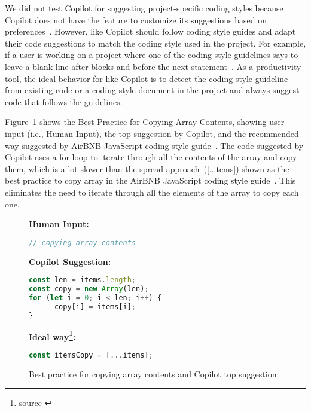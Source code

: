 We did not test Copilot for suggesting project-specific coding styles because Copilot does not have the feature to customize its suggestions based on preferences~\cite{Copilot-web}.
However, \cct{} like Copilot should follow coding style guides and adapt their code suggestions to match the coding style used in the project. 
For example, if a user is working on a project where one of the coding style guidelines says to leave a blank line after blocks and before the next statement~\cite{airbnb_code}. As a productivity tool, the ideal behavior for \cct{} like Copilot is to detect the coding style guideline from existing code or a coding style document in the project and always suggest code that follows the guidelines.

Figure~\ref{fig:bp_1} shows the Best Practice for Copying Array Contents, showing user input (i.e., Human Input), the top suggestion by Copilot, and the recommended way suggested by AirBNB JavaScript coding style guide~\cite{airbnb_code}. 
The code suggested by Copilot uses a for loop to iterate through all the contents of the array and copy them, which is a lot slower than the spread approach~([..items]) shown as the best practice to copy array in the AirBNB JavaScript coding style guide~\cite{airbnb_code}. This eliminates the need to iterate through all the elements of the array to copy each one. 

\begin{figure}[hbt!]
    \centering
\begin{tcolorbox}[title=Copying Array Contents,boxsep=.15mm]
\textbf{Human Input:}
\begin{lstlisting}[language=JavaScript]
// copying array contents
\end{lstlisting}
\tcbline
\textbf{Copilot Suggestion:}
\begin{lstlisting}[language=JavaScript]
const len = items.length;
const copy = new Array(len);
for (let i = 0; i < len; i++) {
	  copy[i] = items[i];
}
\end{lstlisting}
\tcbline
\textbf{Ideal way\footnote{source \cite{airbnb_code}}:}
\begin{lstlisting}[language=JavaScript]
const itemsCopy = [...items];
\end{lstlisting}
\end{tcolorbox}
    \caption{Best practice for copying array contents and Copilot top suggestion.}
    \label{fig:bp_1}
\end{figure}

